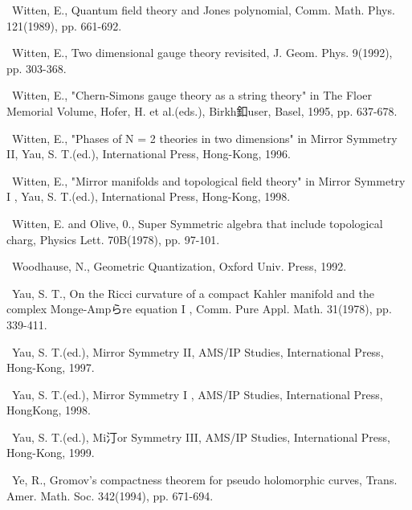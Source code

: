 {\noindent [393]\ Witten, E., Quantum field theory and Jones polynomial, Comm. Math. Phys. 121(1989), pp. 661-692.\par\smallskip
\noindent [394]\ Witten, E., Two dimensional gauge theory revisited, J. Geom. Phys. 9(1992), pp. 303-368.\par\smallskip
\noindent [395]\ Witten, E., "Chern-Simons gauge theory as a string theory" in The Floer Memorial Volume, Hofer, H. et al.(eds.), Birkh釦user, Basel, 1995, pp. 637-678.\par\smallskip
\noindent [396]\ Witten, E., "Phases of N = 2 theories in two dimensions" in Mirror Symmetry II, Yau, S. T.(ed.), International Press, Hong-Kong, 1996.\par\smallskip
\noindent [397]\ Witten, E., "Mirror manifolds and topological field theory" in Mirror Symmetry I , Yau, S. T.(ed.), International Press, Hong-Kong, 1998.\par\smallskip
\noindent [398]\ Witten, E. and Olive, 0., Super Symmetric algebra that include topological charg, Physics Lett. 70B(1978), pp. 97-101.\par\smallskip
\noindent [399]\ Woodhause, N., Geometric Quantization, Oxford Univ. Press, 1992.\par\smallskip
\noindent [400]\ Yau, S. T., On the Ricci curvature of a compact Kahler manifold and the complex Monge-Ampらre equation I , Comm. Pure Appl. Math. 31(1978), pp. 339-411.\par\smallskip
\noindent [401]\ Yau, S. T.(ed.), Mirror Symmetry II, AMS/IP Studies, International Press, Hong-Kong, 1997.\par\smallskip
\noindent [402]\ Yau, S. T.(ed.), Mirror Symmetry I , AMS/IP Studies, International Press, HongKong, 1998.\par\smallskip
\noindent [403]\ Yau, S. T.(ed.), Mi汀or Symmetry III, AMS/IP Studies, International Press, Hong-Kong, 1999.\par\smallskip
\noindent [404]\ Ye, R., Gromov's compactness theorem for pseudo holomorphic curves, Trans. Amer. Math. Soc. 342(1994), pp. 671-694.\par\smallskip
}